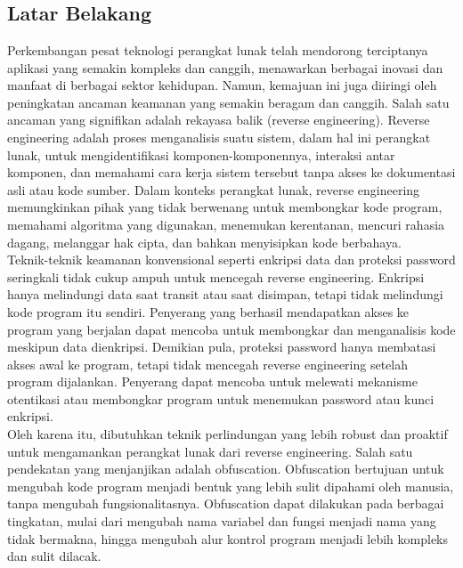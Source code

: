 \chapter{\babSatu}


\section{Latar Belakang}
Perkembangan pesat teknologi perangkat lunak telah mendorong terciptanya aplikasi yang semakin kompleks dan canggih, menawarkan berbagai inovasi dan manfaat di berbagai sektor kehidupan. Namun, kemajuan ini juga diiringi oleh peningkatan ancaman keamanan yang semakin beragam dan canggih. Salah satu ancaman yang signifikan adalah rekayasa balik (reverse engineering). Reverse engineering adalah proses menganalisis suatu sistem, dalam hal ini perangkat lunak, untuk mengidentifikasi komponen-komponennya, interaksi antar komponen, dan memahami cara kerja sistem tersebut tanpa akses ke dokumentasi asli atau kode sumber. Dalam konteks perangkat lunak, reverse engineering memungkinkan pihak yang tidak berwenang untuk membongkar kode program, memahami algoritma yang digunakan, menemukan kerentanan, mencuri rahasia dagang, melanggar hak cipta, dan bahkan menyisipkan kode berbahaya. \\

Teknik-teknik keamanan konvensional seperti enkripsi data dan proteksi password seringkali tidak cukup ampuh untuk mencegah reverse engineering. Enkripsi hanya melindungi data saat transit atau saat disimpan, tetapi tidak melindungi kode program itu sendiri. Penyerang yang berhasil mendapatkan akses ke program yang berjalan dapat mencoba untuk membongkar dan menganalisis kode meskipun data dienkripsi. Demikian pula, proteksi password hanya membatasi akses awal ke program, tetapi tidak mencegah reverse engineering setelah program dijalankan. Penyerang dapat mencoba untuk melewati mekanisme otentikasi atau membongkar program untuk menemukan password atau kunci enkripsi. \\

Oleh karena itu, dibutuhkan teknik perlindungan yang lebih robust dan proaktif untuk mengamankan perangkat lunak dari reverse engineering. Salah satu pendekatan yang menjanjikan adalah obfuscation. Obfuscation bertujuan untuk mengubah kode program menjadi bentuk yang lebih sulit dipahami oleh manusia, tanpa mengubah fungsionalitasnya. Obfuscation dapat dilakukan pada berbagai tingkatan, mulai dari mengubah nama variabel dan fungsi menjadi nama yang tidak bermakna, hingga mengubah alur kontrol program menjadi lebih kompleks dan sulit dilacak. \\

